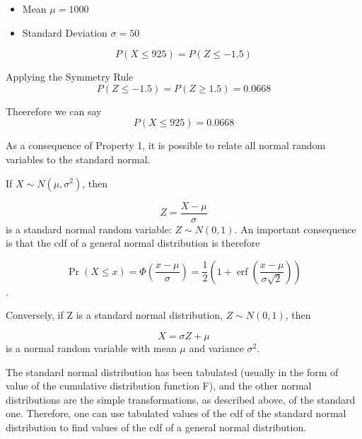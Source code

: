 \documentclass[12pt]{report}
\begin{document}
\begin{itemize}
	\item Mean $\mu= 1000$
	\item Standard Deviation $\sigma = 50$
\end{itemize}



\[ P(X \leq 925)  = P(Z \leq -1.5) \]

Applying the Symmetry Rule
\[ P(Z \leq -1.5) = P(Z \geq 1.5) = 0.0668\]

Theerefore we can say 
\[ P(X \leq 925) = 0.0668 \]



As a consequence of Property 1, it is possible to relate all normal random variables to the standard normal.

If $X \sim N(\mu, \sigma^2)$, then

\[Z = \frac{X - \mu}{\sigma} \]
is a standard normal random variable: $Z \sim N(0,1)$. An important consequence is that the cdf of a general normal distribution is therefore

\[\Pr(X \le x)
=
\Phi
\left(
\frac{x-\mu}{\sigma}
\right)
=
\frac{1}{2}
\left(
1 + \operatorname{erf}
\left(
\frac{x-\mu}{\sigma\sqrt{2}}
\right)
\right)\]
.




Conversely, if Z is a standard normal distribution, $Z \sim N(0,1)$, then

\[X = \sigma Z + \mu\]
is a normal random variable with mean $\mu$ and variance $\sigma^2$.

The standard normal distribution has been tabulated (usually in the form of value of the cumulative distribution function F), and the other normal distributions are the simple transformations, as described above, of the standard one. Therefore, one can use tabulated values of the cdf of the standard normal distribution to 
find values of the cdf of a general normal distribution.


\end{document}
